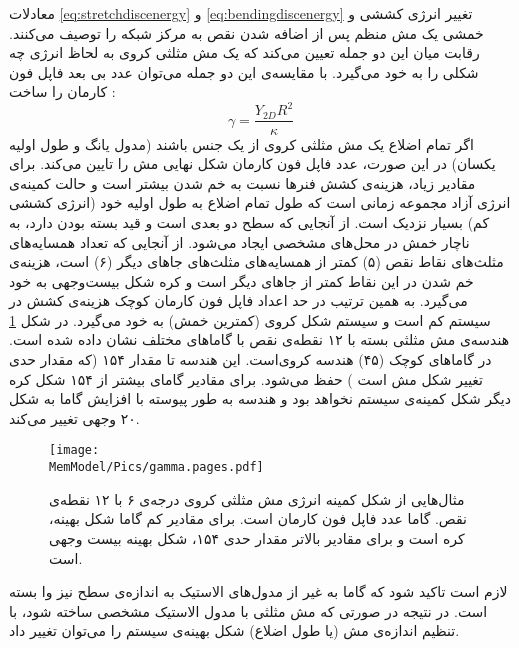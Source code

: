 معادلات
\ref{eq:stretchdiscenergy}
و
\ref{eq:bendingdiscenergy}
تغییر انرژی کششی و خمشی یک مش منظم پس از اضافه شدن نقص به مرکز شبکه را توصیف می‌کنند. رقابت میان این دو جمله تعیین می‌کند که یک مش مثلثی کروی به لحاظ انرژی چه شکلی را به خود می‌گیرد. با مقایسه‌ی این دو جمله می‌توان عدد بی بعد  فاپل فون کارمان
را ساخت
\cite{nelsonPRE2003}
:
\begin{equation}
\gamma = \frac{Y_{2D}R^2}{\kappa}
\label{eq:gamma}
\end{equation}
اگر تمام اضلاع یک مش مثلثی کروی از یک جنس باشند (مدول یانگ و طول اولیه یکسان) در این صورت، عدد فاپل فون کارمان شکل نهایی مش را تایین می‌کند. برای مقادیر زیاد، هزینه‌ی کشش فنر‌ها نسبت به خم شدن بیشتر است و حالت کمینه‌ی انرژی آزاد مجموعه زمانی‌ است که طول تمام اضلاع به طول اولیه‌ خود (انرژی کششی کم) بسیار نزدیک است. از آنجایی که سطح دو بعدی است و قید بسته بودن دارد، به ناچار خمش در محل‌های مشخصی ایجاد می‌شود. از آنجایی که تعداد همسایه‌های مثلث‌های نقاط نقص (۵) کمتر از همسایه‌های مثلث‌های جاهای دیگر (۶) است، هزینه‌ی خم شدن در این نقاط کمتر از جاهای دیگر است و کره شکل بیست‌وجهی
به خود می‌گیرد.
به همین ترتیب در حد اعداد فاپل فون کارمان کوچک هزینه‌ی کشش در سیستم کم است و سیستم شکل کروی (کمترین خمش) به خود می‌گیرد. در شکل
\ref{fig:gamma}
هندسه‌ی مش مثلثی بسته با ۱۲ نقطه‌ی نقص با گاماهای مختلف نشان داده شده است. در گاماها‌ی کوچک (۴۵) هندسه کروی‌است. این هندسه تا مقدار ۱۵۴ (که مقدار حدی تغییر شکل مش است
\cite{nelsonPRE2003}
) حفظ می‌شود. برای مقادیر گامای بیشتر از ۱۵۴ شکل کره دیگر شکل کمینه‌ی سیستم نخواهد بود و هندسه به طور پیوسته با افزایش گاما به شکل ۲۰ وجهی تغییر می‌کند.
\begin{figure}[h]
\begin{center}
\texttt{[image: \\MemModel/Pics/gamma.pages.pdf]}
\caption{
مثال‌هایی از شکل کمینه انرژی مش مثلثی کروی درجه‌ی ۶ با ۱۲ نقطه‌ی نقص. گاما عدد فاپل فون کارمان است. برای مقادیر کم گاما شکل بهینه، کره است و برای مقادیر بالاتر مقدار حدی ۱۵۴، شکل بهینه بیست وجهی است.
}
\label{fig:gamma}
\end{center}
\end{figure}
لازم است تاکید شود که گاما به غیر از مدول‌های الاستیک به اندازه‌ی سطح نیز وا بسته است. در نتیجه در صورتی که مش مثلثی با مدول الاستیک مشخصی ساخته شود، با تنظیم اندازه‌ی مش (یا طول اضلاع) شکل بهینه‌ی سیستم را می‌توان تغییر داد.







